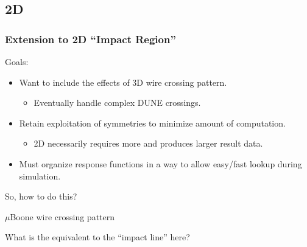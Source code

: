 \documentclass[xcolor=dvipsnames]{beamer}
\begin{document}
\subsection{2D}

\begin{frame}
  \frametitle{Extension to 2D ``Impact Region''}
  Goals:
  \begin{itemize}
  \item Want to include the effects of 3D wire crossing pattern.
    \begin{itemize}\footnotesize
    \item Eventually handle complex DUNE crossings.
    \end{itemize}
  \item Retain exploitation of symmetries to minimize amount of computation.
    \begin{itemize}
    \item 2D necessarily requires more and produces larger result data.
    \end{itemize}
  \item Must organize response functions in a way to allow easy/fast
    lookup during simulation.
  \end{itemize}

  \begin{center}
    So, how to do this?
  \end{center}
\end{frame}

\begin{frame}
  \begin{center}
    $\mu$Boone wire crossing pattern
  \end{center}
  \vspace{6cm}
  \begin{center}
    What is the equivalent to the ``impact line'' here? 
  \end{center}
\end{frame}
\usebackgroundtemplate{}
\end{document}

